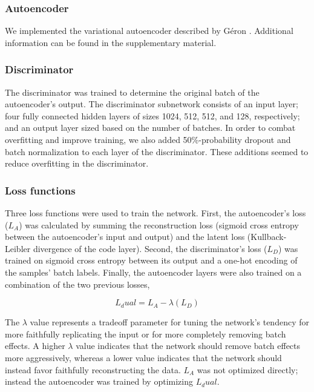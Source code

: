 \documentclass[notitlepage]{article}
\begin{document}
\subsubsection{Autoencoder}

We implemented the variational autoencoder \cite{louizos_variational_2015} described by Géron \cite{geron_hands-machine_2017}.
Additional information can be found in the supplementary material.

\subsubsection{Discriminator}

The discriminator was trained to determine the original batch of the autoencoder's output.
The discriminator subnetwork consists of an input layer; four fully connected hidden layers of sizes 1024, 512, 512, and 128, respectively; and an output layer sized based on the number of batches.
In order to combat overfitting and improve training, we also added 50\%-probability dropout \cite{srivastava_dropout_2014} and batch normalization \cite{ioffe_batch_2015} to each layer of the discriminator.
These additions seemed to reduce overfitting in the discriminator.

\subsubsection{Loss functions}

Three loss functions were used to train the network.
First, the autoencoder's loss ($L_A$) was calculated by summing the reconstruction loss (sigmoid cross entropy between the autoencoder's input and output) and the latent loss (Kullback-Leibler divergence of the code layer).
Second, the discriminator's loss ($L_D$) was trained on sigmoid cross entropy between its output and a one-hot encoding of the samples' batch labels.
Finally, the autoencoder layers were also trained on a combination of the two previous losses,

\begin{equation}
	\label{dual_loss}
	L_dual = L_A - \lambda{}(L_D)
\end{equation}

The $\lambda$ value represents a tradeoff parameter for tuning the network's tendency for more faithfully replicating the input or for more completely removing batch effects.
A higher $\lambda$ value indicates that the network should remove batch effects more aggressively, whereas a lower value indicates that the network should instead favor faithfully reconstructing the data.
$L_A$ was not optimized directly; instead the autoencoder was trained by optimizing $L_dual$.
\end{document}
